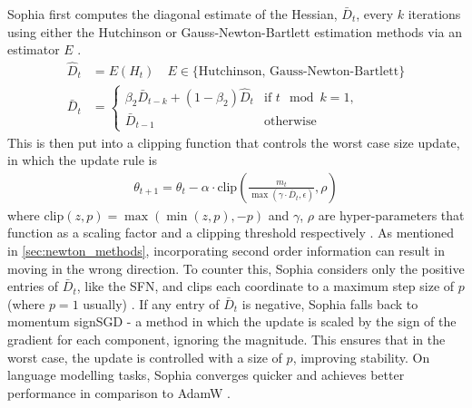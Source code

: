 Sophia first computes the diagonal estimate of the Hessian, $\bar{D}_t$, every $k$ iterations using either the Hutchinson or Gauss-Newton-Bartlett estimation methods via an estimator $E$ \citep{liu2023sophia}. 
\begin{align}
    \hat{D}_t &= E(H_t) \quad E \in \{\text{Hutchinson, Gauss-Newton-Bartlett} \} \\
    \bar{D}_t &= 
    \begin{cases}
        \beta_2 \bar{D}_{t-k} + (1 - \beta_2) \hat{D}_t & \text{if } t \mod k = 1, \\
        \bar{D}_{t-1} & \text{otherwise}
    \end{cases}
\end{align}
This is then put into a clipping function that controls the worst case size update, in which the update rule is
\begin{align}
    \theta_{t+1} = \theta_t - \alpha \cdot \text{clip}(\frac{m_t}{\max(\gamma \cdot \bar{D}_t, \epsilon)}, \rho)
\end{align}
where $\text{clip}(z, p) = \max(\min(z, p), -p)$ and $\gamma$, $\rho$ are hyper-parameters that function as a scaling factor and a clipping threshold respectively \citep{liu2023sophia}. As mentioned in \cref{sec:newton_methods}, incorporating second order information can result in moving in the wrong direction. To counter this, Sophia considers only the positive entries of $\bar{D}_t$, like the SFN, and clips each coordinate to a maximum step size of $p$ (where $p = 1$ usually) \citep{liu2023sophia}. If any entry of $\bar{D}_t$ is negative, Sophia falls back to momentum signSGD - a method in which the update is scaled by the sign of the gradient for each component, ignoring the magnitude. This ensures that in the worst case, the update is controlled with a size of $p$, improving stability. On language modelling tasks, Sophia converges quicker and achieves better performance in comparison to AdamW \cite{liu2023sophia}.

